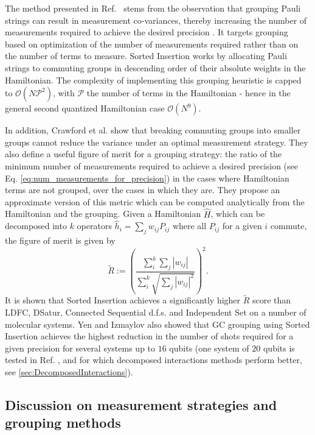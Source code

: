 The method presented in Ref.~\cite{Crawford2021} stems from the observation that grouping Pauli strings can result in measurement co-variances, thereby increasing the number of measurements required to achieve the desired precision \cite{mccleanTheoryVariationalHybrid2015}. It targets grouping based on optimization of the number of measurements required rather than on the number of terms to measure. Sorted Insertion works by allocating Pauli strings to commuting groups in descending order of their absolute weights in the Hamiltonian. The complexity of implementing this grouping heuristic is capped to $\mathcal{O}(N\mathcal{P}^2)$, with $\mathcal{P}$ the number of terms in the Hamiltonian \cite{Crawford2021} - hence in the general second quantized Hamiltonian case  $\mathcal{O}(N^9)$.

In addition, Crawford et al. \cite{Crawford2021} show that breaking commuting groups into smaller groups cannot reduce the variance under an optimal measurement strategy. They also define a useful figure of merit for a grouping strategy: the ratio of the minimum number of measurements required to achieve a desired precision (see Eq. \ref{eq:num_measurements_for_precision}) in the cases where Hamiltonian terms are not grouped, over the cases in which they are. They propose an approximate version of this metric which can be computed analytically from the Hamiltonian and the grouping. Given a Hamiltonian $\hat{H}$, which can be decomposed into $k$ operators $\hat{h}_i = \sum_j w_{ij}P_{ij}$ where all $P_{ij}$ for a given $i$ commute, the figure of merit is given by
\begin{equation}
    \tilde{R}:= \left(\frac{\sum_i^k \sum_j |w_{ij}|}{\sum_i^k \sqrt{\sum_j |w_{ij}|^2}}\right)^2.
\end{equation}
It is shown that Sorted Insertion achieves a significantly higher $\tilde{R}$ score than LDFC, DSatur, Connected Sequential d.f.s. and Independent Set on a number of molecular systems. Yen and Izmaylov \cite{Yen2021_Cartan} also showed that GC grouping using Sorted Insertion achieves the highest reduction in the number of shots required for a given precision for several systems up to $16$ qubits (one system of $20$ qubits is tested in Ref. \cite{Yen2021_Cartan}, and for which decomposed interactions methods \cite{Huggins2021, Yen2021_Cartan} perform better, see \ref{sec:DecomposedInteractions}).

\subsection{Discussion on measurement strategies and grouping methods} \label{sec:discussion_grouping}

